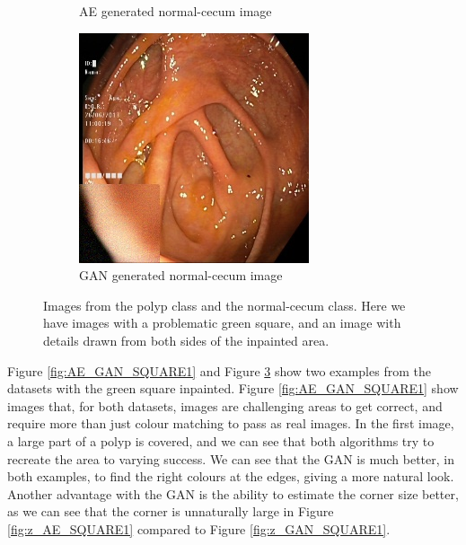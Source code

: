\begin{figure}
\begin{subfigure}[t]{\myfigsizethree}
            \caption{AE generated normal-cecum image}   
            \label{fig:nc_AE_SQUARE2}
        \end{subfigure}
        \qquad%
        \begin{subfigure}[t]{\myfigsizethree}   
            \centering 
            \includegraphics[width=\textwidth]{experiments/figures/greensquare/ncGAN.jpg}
            \caption{GAN generated normal-cecum image}  
            \label{fig:nc_GAN_SQUARE2}
        \end{subfigure}
        \caption{Images from the polyp class and the normal-cecum class. Here we have images with a problematic green square, and an image with details drawn from both sides of the inpainted area.} 
        \label{fig:AE_GAN_SQUARE2}
\end{figure}
    
Figure \ref{fig:AE_GAN_SQUARE1} and Figure \ref{fig:AE_GAN_SQUARE2} show two examples from the datasets with the green square inpainted.
Figure \ref{fig:AE_GAN_SQUARE1} show images that, for both datasets, images are challenging areas to get correct, and require more than just colour matching to pass as real images. In the first image, a large part of a polyp is covered, and we can see that both algorithms try to recreate the area to varying success. We can see that the GAN is much better, in both examples, to find the right colours at the edges, giving a more natural look.
Another advantage with the GAN is the ability to estimate the corner size better, as we can see that the corner is unnaturally large in Figure \ref{fig:z_AE_SQUARE1} compared to Figure \ref{fig:z_GAN_SQUARE1}.


